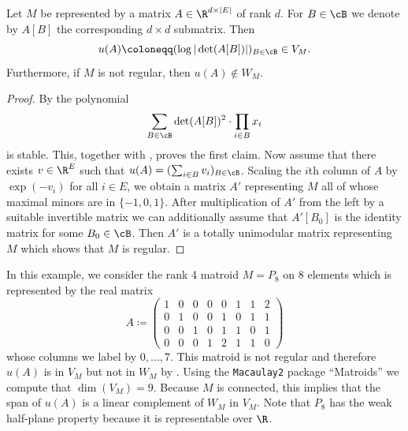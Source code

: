 \begin{lem}\label{lem:notreg}
    Let $M$ be represented by a matrix $A\in\R^{d\times |E|}$ of rank $d$. For $B\in\cB$ we denote by $A[B]$ the corresponding $d\times d$ submatrix. Then 
    \begin{equation*}
        u(A)\coloneqq (\log|\det(A[B])|)_{B\in\cB}\in V_M.
    \end{equation*}
    Furthermore, if $M$ is not regular, then $u(A)\not\in W_M$.
\end{lem}

\begin{proof}
    By \cite[Theorem~8.1]{HPPlong} the polynomial
    \begin{equation*}
        \sum_{B\in\cB}\det(A[B])^2\cdot\prod_{i\in B}x_i
    \end{equation*}
    is stable. This, together with , proves the first claim. Now assume that there exists $v\in\R^E$ such that $u(A)=(\sum_{i\in B}v_i)_{B\in\cB}$. Scaling the $i$th column of $A$ by $\exp(-v_i)$ for all $i\in E$, we obtain a matrix $A'$ representing $M$ all of whose maximal minors are in $\{-1,0,1\}$. After multiplication of $A'$ from the left by a suitable invertible matrix we can additionally assume that $A'[B_0]$ is the identity matrix for some $B_0\in\cB$. Then $A'$ is a totally unimodular matrix representing $M$ which shows that $M$ is regular.
\end{proof}

\begin{ex}\label{ex:p8}
    In this example, we consider the rank 4 matroid $M=P_8$ on 8 elements which is represented by the real matrix
    \[A\coloneqq \begin{pmatrix}
        1&0&0&0&0&1&1&2\\
        0&1&0&0&1&0&1&1\\
        0&0&1&0&1&1&0&1\\
        0&0&0&1&2&1&1&0
    \end{pmatrix}\]
    whose columns we label by $0,\ldots,7$.
    This matroid is not regular \cite[\S A4]{HPPlong} and therefore $u(A)$ is in $V_M$ but not in $W_M$ by . Using the {\texttt{Macaulay2}} \cite{M2} package ``Matroids'' \cite{MatroidsArticle} we compute that $\dim(V_M)=9$. Because $M$ is connected, this implies that the span of $u(A)$ is a linear complement of $W_M$ in $V_M$. Note that $P_8$ has the weak half-plane property because it is representable over $\R$. 
\end{ex}

